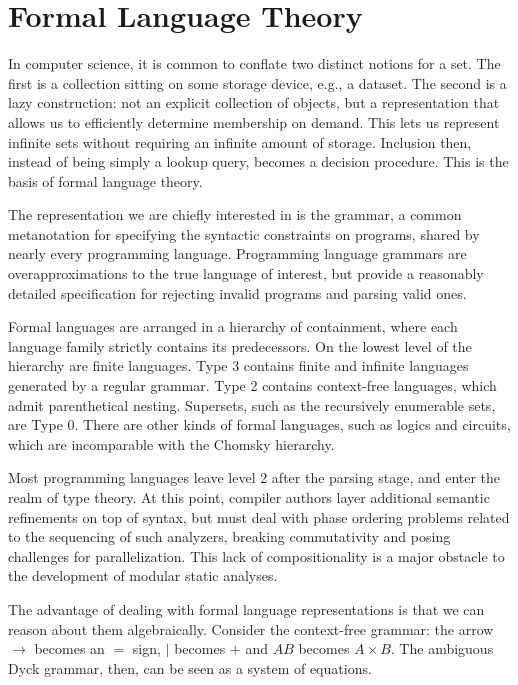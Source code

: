 \chapter{\rm\bfseries Formal Language Theory}
\label{ch:chapter01}

In computer science, it is common to conflate two distinct notions for a set. The first is a collection sitting on some storage device, e.g., a dataset. The second is a lazy construction: not an explicit collection of objects, but a representation that allows us to efficiently determine membership on demand. This lets us represent infinite sets without requiring an infinite amount of storage. Inclusion then, instead of being simply a lookup query, becomes a decision procedure. This is the basis of formal language theory.

The representation we are chiefly interested in is the grammar, a common metanotation for specifying the syntactic constraints on programs, shared by nearly every programming language. Programming language grammars are overapproximations to the true language of interest, but provide a reasonably detailed specification for rejecting invalid programs and parsing valid ones.

Formal languages are arranged in a hierarchy of containment, where each language family strictly contains its predecessors. On the lowest level of the hierarchy are finite languages. Type 3 contains finite and infinite languages generated by a regular grammar. Type 2 contains context-free languages, which admit parenthetical nesting. Supersets, such as the recursively enumerable sets, are  Type 0. There are other kinds of formal languages, such as logics and circuits, which are incomparable with the Chomsky hierarchy.

Most programming languages leave level 2 after the parsing stage, and enter the realm of type theory. At this point, compiler authors layer additional semantic refinements on top of syntax, but must deal with phase ordering problems related to the sequencing of such analyzers, breaking commutativity and posing challenges for parallelization. This lack of compositionality is a major obstacle to the development of modular static analyses.

The advantage of dealing with formal language representations is that we can reason about them algebraically. Consider the context-free grammar: the arrow $\rightarrow$ becomes an $=$ sign, $\mid$ becomes $+$ and $AB$ becomes $A \times B$. The ambiguous Dyck grammar, then, can be seen as a system of equations.

